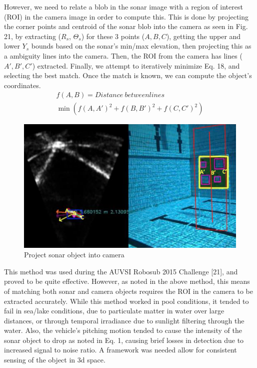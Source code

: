 \documentclass[a4paper]{IEEEtran}
\let\Theta\varTheta
\newcommand{\RSonar}{$\si{\textit{R}_{s}}$\xspace}
\newcommand{\ThetaSonar}{$\si{\Theta_{s}}$\xspace}
\newcommand{\YSonar}{$\si{\textit{Y}_{s}}$\xspace}
\begin{document}
However, we need to relate a blob in the sonar image with a region of interest (ROI) in the camera image in order to compute this. This is done by projecting the corner points and centroid of the sonar blob into the camera as seen in Fig. 21, by extracting (\RSonar, \ThetaSonar) for these 3 points ($A, B, C$), getting the upper and lower \YSonar bounds based on the sonar's min/max elevation, then projecting this as a ambiguity lines into the camera. Then, the ROI from the camera has lines ($A', B', C'$) extracted. Finally, we attempt to iteratively minimize Eq. 18, and selecting the best match. Once the match is known, we can compute the object's coordinates.
\begingroup\makeatletter\def\f@size{7}\check@mathfonts
\begin{gather}
f(A,B) = Distance\ between lines \nonumber\\
\min \left( f\left( A,A' \right)^{2}+f\left( B,B' \right)^{2}+f\left( C,C' \right)^{2} \right)
\end{gather}
\endgroup

\begin{figure}[h!]
  \centering
  \includegraphics[scale=0.3]{project}
  \captionsetup{justification=centering}
  \caption{Project sonar object into camera}
\end{figure}

This method was used during the AUVSI Robosub 2015 Challenge [21], and proved to be quite effective. However, as noted in the above method, this means of matching both sonar and camera objects requires the ROI in the camera to be extracted accurately. While this method worked in pool conditions, it tended to fail in sea/lake conditions, due to particulate matter in water over large distances, or through temporal irradiance due to sunlight filtering through the water. Also, the vehicle's pitching motion tended to cause the intensity of the sonar object to drop as noted in Eq. 1, causing brief losses in detection due to increased signal to noise ratio. A framework was needed allow for consistent sensing of the object in 3d space.
\end{document}
